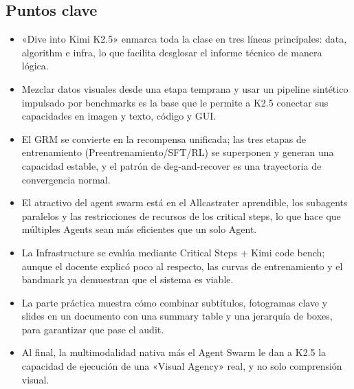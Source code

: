 \documentclass[a4paper]{article}
\begin{document}
\subsection{Puntos clave}
\begin{itemize}
    \item «Dive into Kimi K2.5» enmarca toda la clase en tres líneas principales: data, algorithm e infra, lo que facilita desglosar el informe técnico de manera lógica.
    \item Mezclar datos visuales desde una etapa temprana y usar un pipeline sintético impulsado por benchmarks es la base que le permite a K2.5 conectar sus capacidades en imagen y texto, código y GUI.
    \item El GRM se convierte en la recompensa unificada; las tres etapas de entrenamiento (Preentrenamiento/SFT/RL) se superponen y generan una capacidad estable, y el patrón de deg-and-recover es una trayectoria de convergencia normal.
    \item El atractivo del agent swarm está en el Allcastrater aprendible, los subagents paralelos y las restricciones de recursos de los critical steps, lo que hace que múltiples Agents sean más eficientes que un solo Agent.
    \item La Infrastructure se evalúa mediante Critical Steps + Kimi code bench; aunque el docente explicó poco al respecto, las curvas de entrenamiento y el bandmark ya demuestran que el sistema es viable.
    \item La parte práctica muestra cómo combinar subtítulos, fotogramas clave y slides en un documento con una summary table y una jerarquía de boxes, para garantizar que pase el audit.
    \item Al final, la multimodalidad nativa más el Agent Swarm le dan a K2.5 la capacidad de ejecución de una «Visual Agency» real, y no solo comprensión visual.
\end{itemize}
\end{document}
